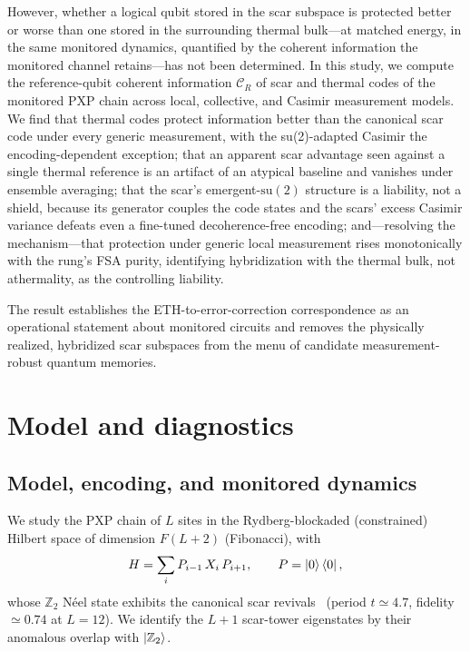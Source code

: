 \documentclass[a4paper,11pt,twocolumn,unpublished]{quantumarticle}
\newcommand{\CR}{\mathcal{C}_R}
\newcommand{\Ztwo}{\mathbb{Z}_2}
\begin{document}
However, whether a logical qubit stored in the scar subspace is protected better
or worse than one stored in the surrounding thermal bulk---at matched energy, in
the same monitored dynamics, quantified by the coherent information the
monitored channel retains---has not been determined. In this study, we compute
the reference-qubit coherent information $\CR$ of scar and thermal codes of the
monitored PXP chain across local, collective, and Casimir measurement models. We find that thermal codes protect
information better than the canonical scar code under every generic
measurement, with the su(2)-adapted Casimir the encoding-dependent
exception; that an apparent scar advantage
seen against a single thermal reference is an artifact of an atypical baseline
and vanishes under ensemble averaging; that the scar's emergent-$\mathrm{
su}(2)$ structure is a liability, not a shield, because its generator couples the
code states and the scars' excess Casimir variance defeats even a fine-tuned
decoherence-free encoding; and---resolving the mechanism---that protection
under generic local measurement rises monotonically with the rung's FSA
purity, identifying hybridization with the thermal bulk, not athermality,
as the controlling liability.

The result establishes the ETH-to-error-correction correspondence as an operational
statement about monitored circuits and removes the physically realized,
hybridized scar subspaces
from the menu of candidate measurement-robust quantum memories.

\section{Model and diagnostics}

\subsection{Model, encoding, and monitored dynamics}

We study the PXP chain of $L$ sites in the Rydberg-blockaded (constrained)
Hilbert space of dimension $F(L{+}2)$ (Fibonacci), with
\begin{equation}
H = \sum_i P_{i-1}\, X_i\, P_{i+1}, \qquad P=\ket{0}\bra{0},
\end{equation}
whose $\Ztwo$ N\'eel state exhibits the canonical scar
revivals~\cite{Bernien2017,Turner2018,Lin2019,Ho2019} (period
$t\simeq4.7$, fidelity $\simeq0.74$ at $L=12$). We identify the $L{+}1$ scar-tower
eigenstates by their anomalous overlap with $\ket{\Ztwo}$.
\end{document}
